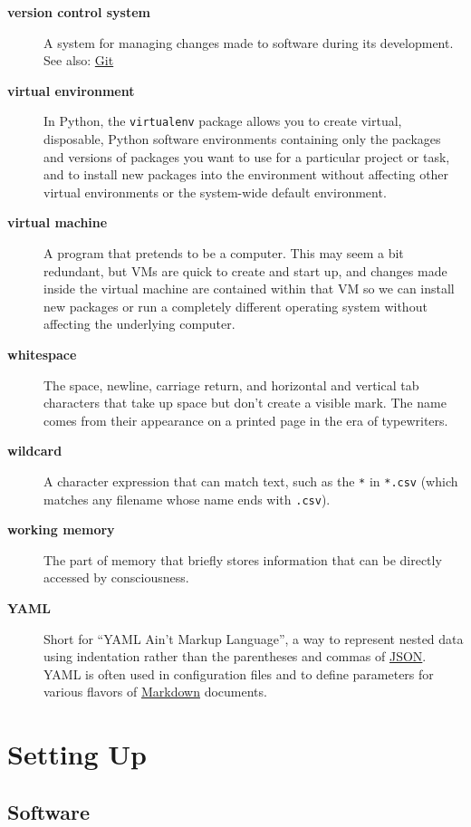 \documentclass[
]{krantz}
\begin{document}
\begin{description}
\item[\textbf{version control system}]
A system for managing changes made to software during its development. See also: \protect\hyperlink{git}{Git}
\item[\textbf{virtual environment}]
In Python, the \texttt{virtualenv} package allows you to create virtual, disposable, Python software environments containing only the packages and versions of packages you want to use for a particular project or task, and to install new packages into the environment without affecting other virtual environments or the system-wide default environment.
\item[\textbf{virtual machine}]
A program that pretends to be a computer. This may seem a bit redundant, but VMs are quick to create and start up, and changes made inside the virtual machine are contained within that VM so we can install new packages or run a completely different operating system without affecting the underlying computer.
\item[\textbf{whitespace}]
The space, newline, carriage return, and horizontal and vertical tab characters that take up space but don't create a visible mark. The name comes from their appearance on a printed page in the era of typewriters.
\item[\textbf{wildcard}]
A character expression that can match text, such as the \texttt{*} in \texttt{*.csv} (which matches any filename whose name ends with \texttt{.csv}).
\item[\textbf{working memory}]
The part of memory that briefly stores information that can be directly accessed by consciousness.
\item[\textbf{YAML}]
Short for ``YAML Ain't Markup Language'', a way to represent nested data using indentation rather than the parentheses and commas of \protect\hyperlink{json}{JSON}. YAML is often used in configuration files and to define parameters for various flavors of \protect\hyperlink{markdown}{Markdown} documents.
\end{description}

\hypertarget{install}{%
\chapter{Setting Up}\label{install}}

\hypertarget{install-software}{%
\section{Software}\label{install-software}}
\end{document}
